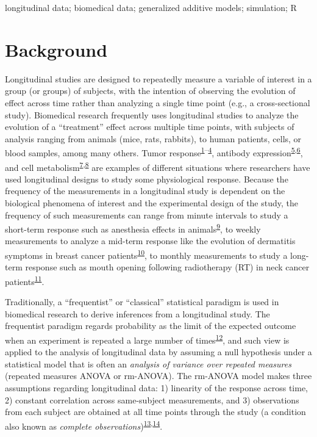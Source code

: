 \documentclass[
]{article}
\begin{document}
longitudinal data; biomedical data; generalized additive models; simulation; R

\hypertarget{background}{%
\section{Background}\label{background}}

Longitudinal studies are designed to repeatedly measure a variable of interest in a group (or groups) of subjects, with the intention of observing the evolution of effect across time rather than analyzing a single time point (e.g., a cross-sectional study). Biomedical research frequently uses longitudinal studies to analyze the evolution of a ``treatment'' effect across multiple time points, with subjects of analysis ranging from animals (mice, rats, rabbits), to human patients, cells, or blood samples, among many others. Tumor response\textsuperscript{\protect\hyperlink{ref-roblyer2011}{1}--\protect\hyperlink{ref-demidov2018}{4}}, antibody expression\textsuperscript{\protect\hyperlink{ref-ritter2001}{5},\protect\hyperlink{ref-roth2017}{6}}, and cell metabolism\textsuperscript{\protect\hyperlink{ref-jones2018}{7},\protect\hyperlink{ref-skala2010}{8}} are examples of different situations where researchers have used longitudinal designs to study some physiological response. Because the frequency of the measurements in a longitudinal study is dependent on the biological phenomena of interest and the experimental design of the study, the frequency of such measurements can range from minute intervals to study a short-term response such as anesthesia effects in animals\textsuperscript{\protect\hyperlink{ref-greening2018}{9}}, to weekly measurements to analyze a mid-term response like the evolution of dermatitis symptoms in breast cancer patients\textsuperscript{\protect\hyperlink{ref-sio2016}{10}}, to monthly measurements to study a long-term response such as mouth opening following radiotherapy (RT) in neck cancer patients\textsuperscript{\protect\hyperlink{ref-kamstra2015}{11}}.

Traditionally, a ``frequentist'' or ``classical'' statistical paradigm is used in biomedical research to derive inferences from a longitudinal study. The frequentist paradigm regards probability as the limit of the expected outcome when an experiment is repeated a large number of times\textsuperscript{\protect\hyperlink{ref-wagenmakers2008}{12}}, and such view is applied to the analysis of longitudinal data by assuming a null hypothesis under a statistical model that is often an \emph{analysis of variance over repeated measures} (repeated measures ANOVA or rm-ANOVA). The rm-ANOVA model makes three assumptions regarding longitudinal data: 1) linearity of the response across time, 2) constant correlation across same-subject measurements, and 3) observations from each subject are obtained at all time points through the study (a condition also known as \emph{complete observations})\textsuperscript{\protect\hyperlink{ref-gueorguieva2004}{13},\protect\hyperlink{ref-schober2018}{14}}.
\end{document}
